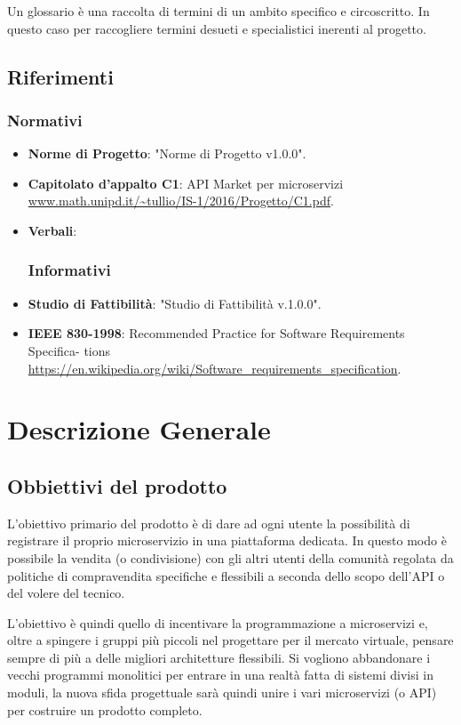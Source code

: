 \documentclass[12pt,a4paper,titlepage]{article}
\begin{document}
	Un glossario è una raccolta di termini di un ambito specifico e circoscritto. In questo caso per raccogliere termini desueti e specialistici inerenti al progetto. 
	\subsection{Riferimenti}
	\subsubsection{Normativi}
	\begin{itemize}
		\item \textbf{Norme di Progetto}:	"Norme di Progetto v1.0.0".
		\item \textbf{Capitolato d'appalto C1}:	API Market per microservizi \\
		\textcolor{blue}{\url{www.math.unipd.it/~tullio/IS-1/2016/Progetto/C1.pdf}}. 
		\item \textbf{Verbali}:
		\subsubsection{Informativi}
		\item \textbf {Studio di Fattibilità}: "Studio di Fattibilità v.1.0.0".
		\item \textbf{IEEE 830-1998}: Recommended Practice for Software Requirements Specifica- tions \\
		\textcolor{blue}{\url{https://en.wikipedia.org/wiki/Software_requirements_specification}}.
	\end{itemize}
	
	\newpage
	
	\section{Descrizione Generale}
	\subsection{Obbiettivi del prodotto}
	L'obiettivo primario del prodotto è di dare ad ogni utente la possibilità di registrare il proprio microservizio in una piattaforma dedicata. In questo modo è possibile la vendita (o condivisione) con gli altri utenti della comunità regolata da politiche di compravendita specifiche e flessibili a seconda dello scopo dell'API o del volere del tecnico. 
	
	L'obiettivo è quindi quello di incentivare la programmazione a microservizi e, oltre a spingere i gruppi più piccoli nel progettare per il mercato virtuale, pensare sempre di più a delle migliori architetture flessibili. Si vogliono abbandonare i vecchi programmi monolitici per entrare in una realtà fatta di sistemi divisi in moduli, la nuova sfida progettuale sarà quindi unire i vari microservizi (o API) per costruire un prodotto completo.
\end{document}
